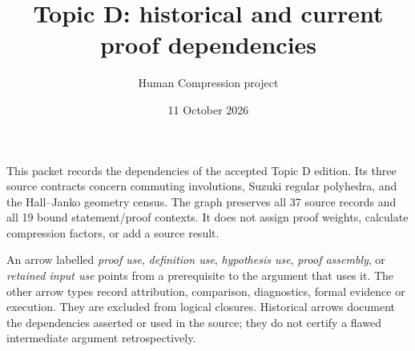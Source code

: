 \documentclass[a4paper,11pt]{article}
\title{Topic D: historical and current proof dependencies}
\author{Human Compression project}
\date{11 October 2026}
\begin{document}
\maketitle
This packet records the dependencies of the accepted Topic D edition. Its
three source contracts concern commuting involutions, Suzuki regular
polyhedra, and the Hall--Janko geometry census. The graph preserves all
37 source records and all 19 bound statement/proof contexts. It does not
assign proof weights, calculate compression factors, or add a source result.

An arrow labelled \emph{proof use}, \emph{definition use}, \emph{hypothesis
use}, \emph{proof assembly}, or \emph{retained input use} points from a
prerequisite to the argument that uses it. The other arrow types record
attribution, comparison, diagnostics, formal evidence or execution. They are
excluded from logical closures. Historical arrows document the dependencies
asserted or used in the source; they do not certify a flawed intermediate
argument retrospectively.
\end{document}
